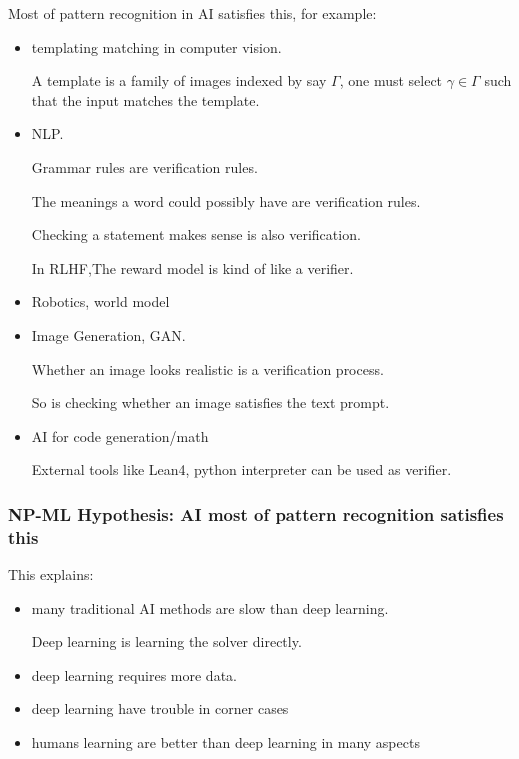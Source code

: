 \documentclass{beamer}   	%
\theoremstyle{definition}
\begin{document}
\begin{frame}
Most of pattern recognition in AI satisfies this, for example:
\begin{itemize}
	\item templating matching in computer vision.

	A template is a family of images indexed by say $\Gamma$, one must select $\gamma\in \Gamma$ such that the input matches the template.
	\item NLP.

	Grammar rules are verification rules.

	The meanings a word could possibly have are verification rules.

	Checking a statement makes sense is also verification.

	In RLHF,The reward model is kind of like a verifier.
	\item Robotics, world model
	\item Image Generation, GAN.

	Whether an image looks realistic is a verification process.

	So is checking whether an image satisfies the text prompt.
	\item AI for code generation/math

	External tools like Lean4, python interpreter can be used as verifier.
\end{itemize}
\end{frame}

\begin{frame}
\frametitle{NP-ML Hypothesis: AI most of pattern recognition satisfies this}
	
\begin{center}
\end{center}

This explains:
\begin{itemize}
	\item many traditional AI methods are slow than deep learning.

	Deep learning is learning the solver directly.
	\item deep learning requires more data.
	\item deep learning have trouble in corner cases 
	\item humans learning are better than deep learning in many aspects
\end{itemize}
\end{frame}
\end{document}
